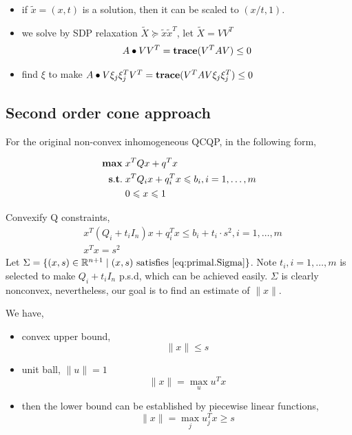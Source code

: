 \documentclass[../main]{subfiles}
\begin{document}
\begin{itemize}
    \item if \(\tilde x=(x, t)\) is a solution, then it can be scaled to \((x/t, 1)\).
    \item we solve by SDP relaxation \(\tilde X \succeq \tilde x\tilde x^T\), let \(\tilde X = VV^T\)
          \begin{align*}
               & A \bullet VV^T = \mathbf{trace}(V^TAV) \le 0 \\
          \end{align*}
    \item find \(\xi\) to make \(A \bullet V\xi_{j}\xi_{j}^TV^T = \mathbf{trace}{(V^TAV\xi_{j}\xi_{j}^T)} \le 0\)
\end{itemize}


\subsection{Second order cone approach}
For the original non-convex inhomogeneous QCQP, in the following form,

\begin{align}
    \mathbf{max}\; & x^T Q x+q^T x                                    \\
    \mathbf{s.t.}\; & x^T Q_i x+q_i^T x \leqslant b_{i}, i= 1,\dots, m \\
        & 0 \leqslant x \leqslant 1
\end{align}

Convexify Q constraints,
\begin{equation}\label{eq:primal.Sigma}
    \begin{aligned}
         & x^T(Q_i+t_i I_n) x+q_i^T x \leqslant b_i+ t_i \cdot s^2,i= 1,\dots, m \\
         & x^T x= s^2
    \end{aligned}
\end{equation}
Let \(\Sigma = \{(x,s)\in \mathbb R^{n+1}\mid (x,s) \textrm{ satisfies \eqref{eq:primal.Sigma}} \}\). Note \(t_i, i=1,\dots, m\) is selected to make \(Q_i+t_i I_n\) p.s.d, which can be achieved easily. \(\Sigma\) is clearly nonconvex, nevertheless, our goal is to find an estimate of \(\|x\|\).

We have,

\begin{itemize}
    \item convex upper bound,
          \begin{equation} \|x\| \le s \end{equation}
    \item unit ball, \(\|u\| = 1\)
          \begin{equation} \|x\| = \max_u u^T x \end{equation}
    \item then the lower bound can be established by piecewise linear functions,
          \begin{equation}
              \|x\| = \max_j u^T_j x \ge s
          \end{equation}
\end{itemize}
\end{document}
